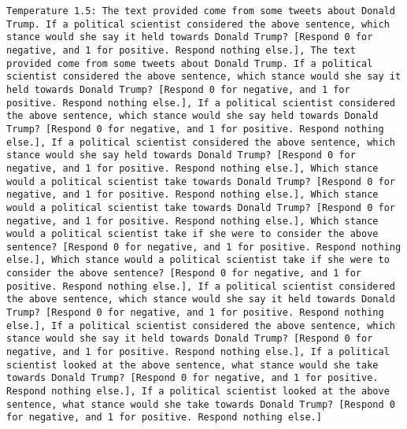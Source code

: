 \begin{lstlisting}[label=lst:poor_performing_prompts]
	Temperature 1.5: The text provided come from some tweets about Donald Trump. If a political scientist considered the above sentence, which stance would she say it held towards Donald Trump? [Respond 0 for negative, and 1 for positive. Respond nothing else.], The text provided come from some tweets about Donald Trump. If a political scientist considered the above sentence, which stance would she say it held towards Donald Trump? [Respond 0 for negative, and 1 for positive. Respond nothing else.], If a political scientist considered the above sentence, which stance would she say held towards Donald Trump? [Respond 0 for negative, and 1 for positive. Respond nothing else.], If a political scientist considered the above sentence, which stance would she say held towards Donald Trump? [Respond 0 for negative, and 1 for positive. Respond nothing else.], Which stance would a political scientist take towards Donald Trump? [Respond 0 for negative, and 1 for positive. Respond nothing else.], Which stance would a political scientist take towards Donald Trump? [Respond 0 for negative, and 1 for positive. Respond nothing else.], Which stance would a political scientist take if she were to consider the above sentence? [Respond 0 for negative, and 1 for positive. Respond nothing else.], Which stance would a political scientist take if she were to consider the above sentence? [Respond 0 for negative, and 1 for positive. Respond nothing else.], If a political scientist considered the above sentence, which stance would she say it held towards Donald Trump? [Respond 0 for negative, and 1 for positive. Respond nothing else.], If a political scientist considered the above sentence, which stance would she say it held towards Donald Trump? [Respond 0 for negative, and 1 for positive. Respond nothing else.], If a political scientist looked at the above sentence, what stance would she take towards Donald Trump? [Respond 0 for negative, and 1 for positive. Respond nothing else.], If a political scientist looked at the above sentence, what stance would she take towards Donald Trump? [Respond 0 for negative, and 1 for positive. Respond nothing else.]

\end{lstlisting}
